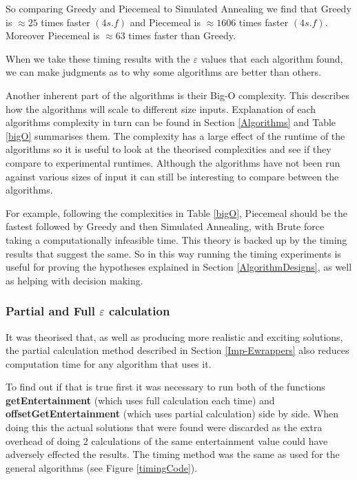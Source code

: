\documentclass[12pt]{report}
\begin{document}
So comparing Greedy and Piecemeal to Simulated Annealing we find that Greedy is $\approx 25$ times faster $(4 s.f)$ and Piecemeal is $\approx 1606$ times faster $(4 s.f)$. Moreover Piecemeal is $\approx 63$ times faster than Greedy.

When we take these timing results with the $\varepsilon$ values that each algorithm found, we can make judgments as to why some algorithms are better than others.

Another inherent part of the algorithms is their Big-O complexity. This describes how the algorithms will scale to different size inputs. Explanation of each algorithms complexity in turn can be found in Section \ref{Algorithms} and Table \ref{bigO} summarises them. The complexity has a large effect of the runtime of the algorithms so it is useful to look at the theorised complexities and see if they compare to experimental runtimes. Although the algorithms have not been run against various sizes of input it can still be interesting to compare between the algorithms.

For example, following the complexities in Table \ref{bigO}, Piecemeal should be the fastest followed by Greedy and then Simulated Annealing, with Brute force taking a computationally infeasible time. This theory is backed up by the timing results that suggest the same. So in this way running the timing experiments is useful for proving the  hypotheses explained in Section \ref{AlgorithmDesigns}, as well as helping with decision making.

\subsubsection{Partial and Full $\varepsilon$ calculation}
It was theorised that, as well as producing more realistic and exciting solutions, the partial calculation method described in Section \ref{Imp-Ewrappers} also reduces computation time for any algorithm that uses it.

To find out if that is true first it was necessary to run both of the functions \textbf{getEntertainment} (which uses full calculation each time) and \textbf{offsetGetEntertainment} (which uses partial calculation) side by side. When doing this the actual solutions that were found were discarded as the extra overhead of doing 2 calculations of the same entertainment value could have adversely effected the results. The timing method was the same as used for the general algorithms (see Figure \ref{timingCode}).
\end{document}
